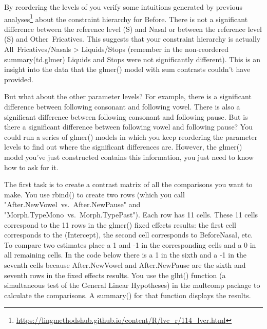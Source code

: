 \documentclass[
  10pt,
  letterpaper]{article}
\renewcommand\texttt[1]{{\ttfamily\color{BrickRed}#1}}
\DeclareRobustCommand{\href}[2]{#2\footnote{\url{#1}}}
\begin{document}
By reordering the levels of you verify some intuitions generated by
\href{https://lingmethodshub.github.io/content/R/lvc_r/114_lvcr.html}{previous
analyses} about the constraint hierarchy for \texttt{Before}. There is
not a significant difference between the reference level (\texttt{S})
and \texttt{Nasal} or between the reference level (\texttt{S}) and
\texttt{Other\ Fricatives}. This suggests that your constraint hierarchy
is actually \texttt{All\ Fricatives/Nasals} \textgreater{}
\texttt{Liquids/Stops} (remember in the non-reordered
\texttt{summary(td.glmer)} \texttt{Liquids} and \texttt{Stops} were not
significantly different). This is an insight into the data that the
\texttt{glmer()} model with sum contrasts couldn't have provided.

But what about the other parameter levels? For example, there is a
significant difference between following consonant and following vowel.
There is also a significant difference between following consonant and
following pause. But is there a significant difference between following
vowel and following pause? You could run a series of \texttt{glmer()}
models in which you keep reordering the parameter levels to find out
where the significant differences are. However, the \texttt{glmer()}
model you've just constructed contains this information, you just need
to know how to ask for it.

The first task is to create a contrast matrix of all the comparisons you
want to make. You use \texttt{rbind()} to create two rows (which you
call \texttt{"After.NewVowel\ vs.\ After.NewPause"} and
\texttt{"Morph.TypeMono\ vs.\ Morph.TypePast"}). Each row has 11 cells.
These 11 cells correspond to the 11 rows in the \texttt{glmer()} fixed
effects results: the first cell corresponds to the \texttt{(Intercept)},
the second cell corresponds to \texttt{BeforeNasal}, etc. To compare two
estimates place a \texttt{1} and \texttt{-1} in the corresponding cells
and a \texttt{0} in all remaining cells. In the code below there is a
\texttt{1} in the sixth and a \texttt{-1} in the seventh cells because
\texttt{After.NewVowel} and \texttt{After.NewPause} are the sixth and
seventh rows in the fixed effects results. You use the \texttt{glht()}
function (a simultaneous test of the General Linear Hypotheses) in the
\texttt{multcomp} package to calculate the comparisons. A
\texttt{summary()} for that function displays the results.
\end{document}
